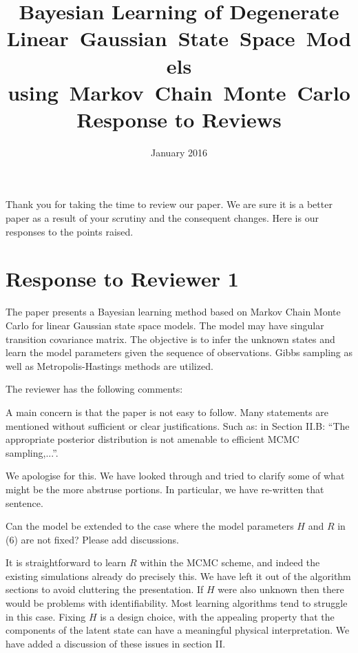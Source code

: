 \documentclass{article}
\title{Bayesian Learning of Degenerate Linear~Gaussian~State~Space~Models using~Markov~Chain~Monte~Carlo \\ Response to Reviews}
\date{January 2016}
\newenvironment{review}[0]{\begin{itshape}\color{Gray}\noindent}{\end{itshape}\vspace{0.4cm}}
\newenvironment{response}[0]{\noindent}{\vspace{0.4cm}}
\begin{document}
\maketitle

Thank you for taking the time to review our paper. We are sure it is a better paper as a result of your scrutiny and the consequent changes. Here is our responses to the points raised.

\section*{Response to Reviewer 1}

\begin{review}
The paper presents a Bayesian learning method based on Markov Chain Monte Carlo for linear Gaussian state space models. The model may have singular transition covariance matrix. The objective is to infer the unknown states and learn the model parameters given the sequence of observations. Gibbs sampling as well as Metropolis-Hastings methods are utilized.

The reviewer has the following comments:

A main concern is that the paper is not easy to follow. Many statements are mentioned without sufficient or clear justifications. Such as: in Section II.B: ``The appropriate posterior distribution is not amenable to efficient MCMC sampling,...''.
\end{review}

\begin{response}
 We apologise for this. We have looked through and tried to clarify some of what might be the more abstruse portions. In particular, we have re-written that sentence.
\end{response}

\begin{review}
Can the model be extended to the case where the model parameters $H$ and $R$ in (6) are not fixed? Please add discussions.
\end{review}

\begin{response}
 It is straightforward to learn $R$ within the MCMC scheme, and indeed the existing simulations already do precisely this. We have left it out of the algorithm sections to avoid cluttering the presentation. If $H$ were also unknown then there would be problems with identifiability. Most learning algorithms tend to struggle in this case. Fixing $H$ is a design choice, with the appealing property that the components of the latent state can have a meaningful physical interpretation. We have added a discussion of these issues in section II.
\end{response}
\end{document}
